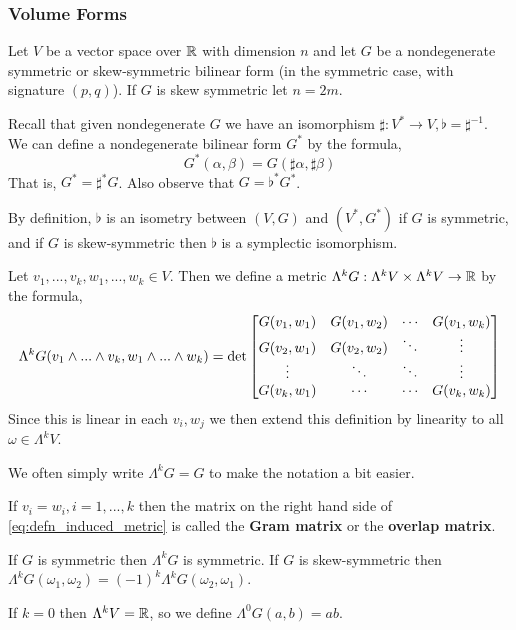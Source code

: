 \subsubsection{Volume Forms}
Let $V$ be a vector space over $\operatorname{\mathbb{R}}$ with dimension $n$ and let $G$ be a nondegenerate symmetric or skew-symmetric bilinear form (in the symmetric case, with signature $(p,q)$). If $G$ is skew symmetric let $n=2m$.
\begin{defn}
Recall that given nondegenerate $G$ we have an isomorphism $\sharp : V^* \to V, \flat = \sharp^{-1}$. We can define a nondegenerate bilinear form $G^*$ by the formula,
\begin{equation}
    G^*(\alpha,\beta) = G(\sharp \alpha,\sharp \beta)
\end{equation}
    That is, $G^* = \sharp^* G$. Also observe that $G = \flat^* G^*$.
\end{defn}
\begin{remark*}
    By definition, $\flat$ is an isometry between $(V,G)$ and $(V^*,G^*)$ if $G$ is symmetric, and if $G$ is skew-symmetric then $\flat$ is a symplectic isomorphism.
\end{remark*}
\begin{defn}
Let $v_1,...,v_k,w_1,...,w_k\in V$. Then we define a metric $\Lambda^k G : \Lambda^k V \times \Lambda^k V \to \operatorname{\mathbb{R}}$ by the formula,
\begin{equation}
    \Lambda^k G(v_1\wedge...\wedge v_k, w_1\wedge...\wedge w_k) = \det \begin{bmatrix}G(v_1,w_1) & G(v_1,w_2) & \cdots & G(v_1,w_k)\\
    G(v_2,w_1)&G(v_2,w_2)&\ddots & \vdots\\
    \vdots & \ddots & \ddots & \vdots\\
    G(v_k,w_1)&\cdots & \cdots & G(v_k,w_k)\end{bmatrix}\label{eq:defn_induced_metric}
\end{equation}
Since this is linear in each $v_i,w_j$ we then extend this definition by linearity to all $\omega \in \Lambda^k V$.

We often simply write $\Lambda^k G = G$ to make the notation a bit easier.
\end{defn}
\begin{remark*}
    If $v_i=w_i, i=1,...,k$ then the matrix on the right hand side of \eqref{eq:defn_induced_metric} is called the \textbf{Gram matrix} or the \textbf{overlap matrix}.
\end{remark*}
\begin{remark*}
    If $G$ is symmetric then $\Lambda^k G$ is symmetric. If $G$ is skew-symmetric then $\Lambda^k G(\omega_1,\omega_2) = (-1)^k \Lambda^k G(\omega_2,\omega_1)$.
\end{remark*}
\begin{remark*}
    If $k = 0$ then $\Lambda^k V = \operatorname{\mathbb{R}}$, so we define $\Lambda^0 G(a,b) = ab$.
\end{remark*}

